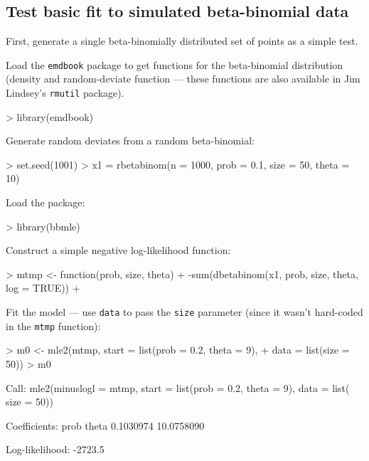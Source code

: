 \documentclass{article}
\newcommand{\code}[1]{{\tt #1}}
\begin{document}
\subsection{Test basic fit to simulated beta-binomial data}

First, generate a single beta-binomially distributed
set of points as a simple test.

Load the \code{emdbook} package
to get functions for the beta-binomial distribution (density and random-deviate 
function --- these functions are also available
in Jim Lindsey's \code{rmutil} package).
\begin{Schunk}
\begin{Sinput}
> library(emdbook)
\end{Sinput}
\end{Schunk}

Generate random deviates from a random beta-binomial:
\begin{Schunk}
\begin{Sinput}
> set.seed(1001)
> x1 = rbetabinom(n = 1000, prob = 0.1, size = 50, theta = 10)
\end{Sinput}
\end{Schunk}

Load the package:
\begin{Schunk}
\begin{Sinput}
> library(bbmle)
\end{Sinput}
\end{Schunk}

Construct a simple negative log-likelihood function:
\begin{Schunk}
\begin{Sinput}
> mtmp <- function(prob, size, theta) {
+     -sum(dbetabinom(x1, prob, size, theta, log = TRUE))
+ }
\end{Sinput}
\end{Schunk}

Fit the model --- use \code{data} to pass the \code{size}
parameter (since it wasn't hard-coded in the \code{mtmp}
function):
\begin{Schunk}
\begin{Sinput}
> m0 <- mle2(mtmp, start = list(prob = 0.2, theta = 9), 
+     data = list(size = 50))
> m0
\end{Sinput}
\begin{Soutput}
Call:
mle2(minuslogl = mtmp, start = list(prob = 0.2, theta = 9), data = list(
    size = 50))

Coefficients:
      prob      theta 
 0.1030974 10.0758090 

Log-likelihood: -2723.5 
\end{Soutput}
\end{Schunk}
\end{document}
